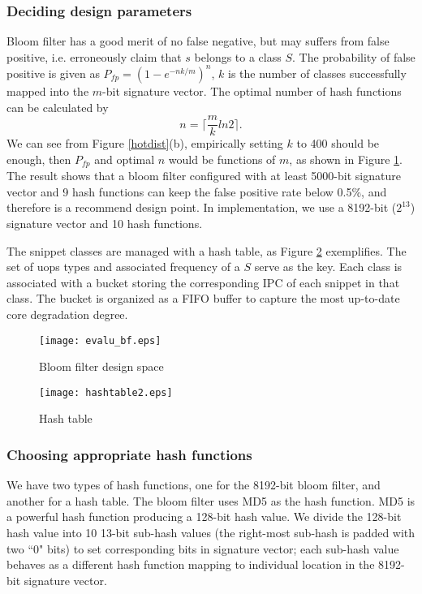 \subsubsection{Deciding design parameters}
Bloom filter \cite{bloomfilter} has a good merit of no false negative, but may suffers from false positive, i.e. erroneously claim that $s$ belongs to a class $S$.  The probability of false positive  is given as  $P_{fp}=(1-e^{-nk/m})^n$, $k$ is the number of classes successfully mapped into the $m$-bit signature vector.  The optimal number of hash functions can be calculated by
\begin{equation}
  n=\lceil \frac{m}{k}ln2\rceil.
\end{equation}
We can see from Figure \ref{hotdist}(b),  empirically setting $k$ to 400 should be enough, then $P_{fp}$ and optimal $n$ would be functions of $m$, as shown in Figure \ref{evalubf}. The result shows that a bloom filter configured with at least 5000-bit signature vector and 9 hash functions can keep the false positive rate below 0.5\%, and therefore is a recommend design point.  In implementation, we use a 8192-bit ($2^{13}$) signature vector and 10 hash functions.

The snippet classes are managed with a hash table, as Figure \ref{hashtable} exemplifies. The set of uops types and associated frequency of a $S$ serve as the key. Each class is associated with a bucket storing the corresponding IPC of each snippet in that class.  The bucket is organized as a FIFO buffer to capture the most up-to-date core degradation degree.

\begin{figure}[t]
  \centering
  \texttt{[image: evalu\_bf.eps]}\\
  \caption{Bloom filter design space}\label{evalubf}

\end{figure}

\begin{figure}[t]
  \centering
  \texttt{[image: hashtable2.eps]}\\
  \caption{Hash table}\label{hashtable}
\end{figure}

\subsubsection{Choosing appropriate hash functions}
We have two types of hash functions, one for the 8192-bit bloom filter, and another for a hash table. The bloom filter uses MD5 \cite{md5} as the hash function. MD5 is a powerful hash function producing a 128-bit hash value. We divide the 128-bit hash value into 10 13-bit sub-hash values (the right-most sub-hash is padded with two ``0" bits)   to set corresponding bits in signature vector; each sub-hash value behaves as a different hash function mapping to individual location in the 8192-bit signature vector.

